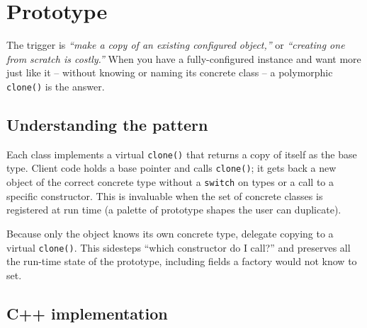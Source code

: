 \section{Prototype}
\label{sec:pat-prototype}


\begin{patternbox}
The trigger is \emph{``make a copy of an existing configured object,''} or
\emph{``creating one from scratch is costly.''} When you have a
fully-configured instance and want more just like it -- without knowing or
naming its concrete class -- a polymorphic \texttt{clone()} is the answer.
\end{patternbox}

\subsection*{Understanding the pattern}

Each class implements a virtual \texttt{clone()} that returns a copy of
itself as the base type. Client code holds a base pointer and calls
\texttt{clone()}; it gets back a new object of the correct concrete type
without a \texttt{switch} on types or a call to a specific constructor.
This is invaluable when the set of concrete classes is registered at run
time (a palette of prototype shapes the user can duplicate).

\begin{ideabox}
Because only the object knows its own concrete type, delegate copying to a
virtual \texttt{clone()}. This sidesteps ``which constructor do I call?''
and preserves all the run-time state of the prototype, including fields a
factory would not know to set.
\end{ideabox}

\subsection*{C++ implementation}

